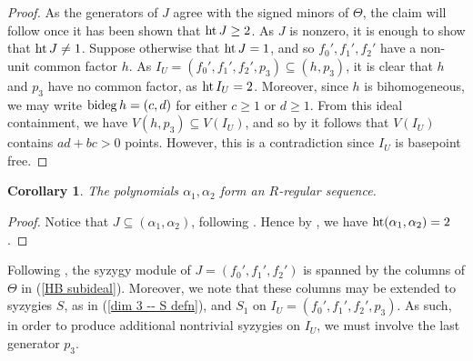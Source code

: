 \documentclass[reqno]{amsart}
\newtheorem{cor}[thm]{Corollary}
\numberwithin{equation}{section}
\theoremstyle{definition}
\def\hgt{\mathop{\rm ht}}
\def\bideg{\mathop{\rm bideg}}
\begin{document}
\begin{proof}
As the generators of $J$ agree with the signed minors of $\Theta$, the claim will follow once it has been shown that $\hgt J \geq 2$. As $J$ is nonzero, it is enough to show that $\hgt J \neq 1$. Suppose otherwise that $\hgt J=1$, and so $f_0',f_1',f_2'$ have a non-unit common factor $h$. As $I_U = (f_0',f_1',f_2',p_3)\subseteq (h,p_3)$, it is clear that $h$ and $p_3$ have no common factor, as $ \hgt I_U =2$. Moreover, since $h$ is bihomogeneous, we may write $\bideg h= (c,d)$ for either $c\geq 1$ or $d\geq 1$. From this ideal containment, we have $V(h,p_3)\subseteq V(I_U)$, and so by  it follows that $V(I_U)$ contains $ad+bc >0$ points. However, this is a contradiction since $I_U$ is basepoint free. 
\end{proof}




\begin{cor}\label{dim 3 - alpha1 alpha2 reg sequence}
The polynomials $\alpha_1, \alpha_2$ form an $R$-regular sequence.   
\end{cor}

\begin{proof}
Notice that $J\subseteq (\alpha_1, \alpha_2)$, following . Hence by , we have $\hgt (\alpha_1,\alpha_2) = 2$.
\end{proof}





Following , the syzygy module of $J=(f_0',f_1',f_2')$ is spanned by the columns of $\Theta$ in (\ref{HB subideal}). Moreover, we note that these columns may be extended to syzygies $S$, as in (\ref{dim 3 -- S defn}), and $S_1$ on $I_U=(f_0',f_1',f_2',p_3)$. As such, in order to produce additional nontrivial syzygies on $I_U$, we must involve the last generator $p_3$.
\end{document}
